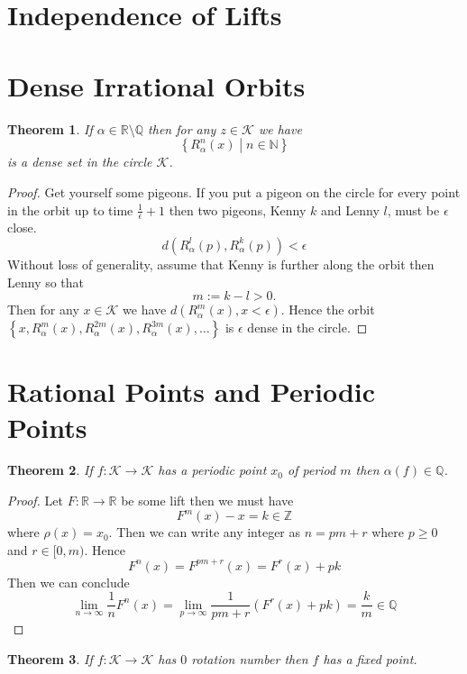 \documentclass[11pt]{article}
\newcommand{\defeq}{:=}
\newcommand{\relmiddle}[1]{\mathrel{}\middle#1\mathrel{}}
\newcommand{\rmv}{\relmiddle|}
\newcommand{\R}{\mathbb{R}}
\newcommand{\Z}{\mathbb{Z}}
\newcommand{\N}{\mathbb{N}}
\newcommand{\Q}{\mathbb{Q}}
\newtheorem{theorem}{Theorem}[section]
\begin{document}
\section{Independence of Lifts}

\section{Dense Irrational Orbits}
\begin{theorem}
If $\alpha\in\R\setminus\Q$ then for any $z\in\mathcal{K}$ we have
\[
	\left\{R_\alpha^n(x) \rmv n\in \N\right\}
\]
is a dense set in the circle $\mathcal{K}$.
\end{theorem}

\begin{proof}
Get yourself some pigeons.
If you put a pigeon on the circle for every point in the orbit up to time $\frac{1}{\epsilon}+1$ then two pigeons, Kenny $k$ and Lenny $l$, must be $\epsilon$ close.
\[
	d(R_\alpha^l(p), R_\alpha^k(p)) < \epsilon
\]
Without loss of generality, assume that Kenny is further along the orbit then Lenny so that 
\[m\defeq k-l > 0.\]
Then for any $x\in\mathcal{K}$ we have $d(R_\alpha^m(x), x < \epsilon)$.
Hence the orbit $\left\{x, R_\alpha^m(x), R_\alpha^{2m}(x), R_\alpha^{3m}(x) , \dots\right\}$ is $\epsilon$ dense in the circle.
\end{proof}

\section{Rational Points and Periodic Points}
\begin{theorem}
If $f:\mathcal{K}\to\mathcal{K}$ has a periodic point $x_0$ of period $m$ then $\alpha(f)\in\Q$.
\end{theorem}
\begin{proof}
Let $F:\R\to\R$ be some lift then we must have
\[
	F^m(x)-x = k\in \Z
\]
where $\rho(x)=x_0$.
Then we can write any integer as $n=pm+r$ where $p\geq 0$ and $r\in[0, m)$.
Hence
\[
	F^n(x)=F^{pm+r}(x)=F^r(x)+pk
\]
Then we can conclude
\[
	\lim_{n\to\infty}\frac{1}{n}F^n(x)=\lim_{p\to\infty}\frac{1}{pm+r}\left(F^r(x)+pk\right)=\frac{k}{m}\in\Q
\]
\end{proof}

\begin{theorem}
If $f:\mathcal{K}\to\mathcal{K}$ has $0$ rotation number then $f$ has a fixed point.
\end{theorem}
\end{document}
